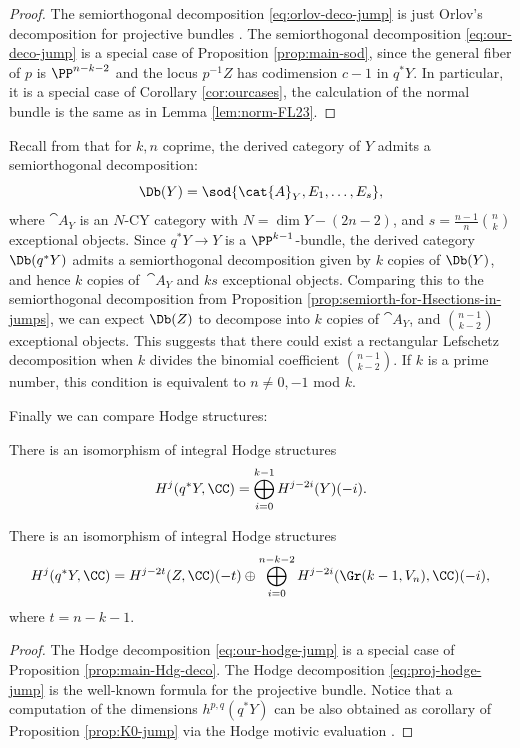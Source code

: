 \begin{proof}
The semiorthogonal decomposition \eqref{eq:orlov-deco-jump} is just Orlov's decomposition for projective
bundles \cite{orlovprojbund}. The semiorthogonal decomposition \eqref{eq:our-deco-jump} is a special
case of Proposition \ref{prop:main-sod}, since the general fiber of $p$ is $\PP^{n-k-2}$ and the
locus $p^{-1}Z$ has codimension $c-1$ in $q^*Y$. In particular, it is a special case of
Corollary \ref{cor:ourcases}, the calculation of the normal bundle is the same as in Lemma \ref{lem:norm-FL23}.
\end{proof}

Recall from \cite[Cor.\,4.4]{kuz-fractional} that for $k,n$ coprime, the derived category of $Y$
admits a semiorthogonal decomposition:
\[
\Db(Y)= \sod{\cat{A}_Y,E_1,\ldots,E_s},
\]
where $\cat{A}_Y$ is an $N$-CY category with $N=\dim Y-(2n-2)$, and $s=\frac{n-1}{n}\binom{n}{k}$ exceptional objects.
Since $q^*Y \to Y$ is a $\PP^{k-1}$-bundle, the derived category
$\Db(q^*Y)$ admits a semiorthogonal decomposition given by $k$ copies of $\Db(Y)$, and hence
$k$ copies of~$\cat{A}_Y$ and $ks$ exceptional objects. Comparing this to the semiorthogonal
decomposition from Proposition \ref{prop:semiorth-for-Hsections-in-jumps},
we can expect $\Db(Z)$ to decompose into $k$ copies of $\cat{A}_Y$,
and $\binom{n-1}{k-2}$ exceptional objects. This suggests that there could exist a rectangular Lefschetz
decomposition when $k$ divides the binomial coefficient $\binom{n-1}{k-2}$. If $k$ is a prime
number, this condition is equivalent to $n\ne 0,-1$ mod $k$.

Finally we can compare Hodge structures:

\begin{prop}\label{prop:Hodge-jump}
There is an isomorphism of integral Hodge structures
\begin{equation}\label{eq:proj-hodge-jump}
H^j(q^*Y,\CC) = \bigoplus_{i=0}^{k-1} H^{j-2i}(Y)(-i).
\end{equation}

There is an isomorphism of integral Hodge structures
\begin{equation}\label{eq:our-hodge-jump}
H^j(q^*Y,\CC) = H^{j-2t}(Z,\CC)(-t) \oplus \bigoplus_{i=0}^{n-k-2} H^{j-2i}(\Gr(k-1,V_n),\CC)(-i),
\end{equation}
where $t=n-k-1$.
\end{prop}

\begin{proof}
The Hodge decomposition \eqref{eq:our-hodge-jump} is a special case of Proposition \ref{prop:main-Hdg-deco}. The Hodge decomposition \eqref{eq:proj-hodge-jump} is the well-known formula for the projective bundle.
Notice that a computation of the dimensions $h^{p,q}(q^*Y)$ can be also obtained as corollary of Proposition \ref{prop:K0-jump} via the Hodge motivic evaluation
\cite[\S 3.2]{craw}.
\end{proof}

